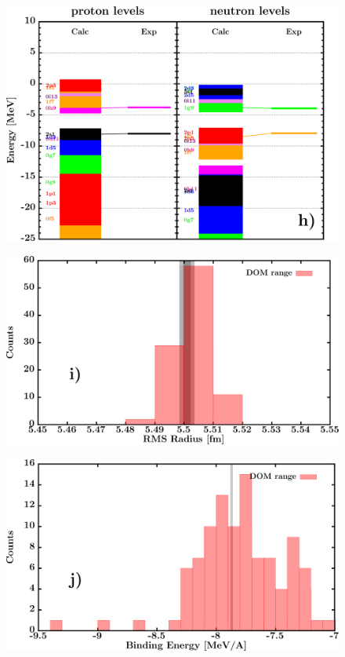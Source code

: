 \documentclass[twocolumn,secnumarabic,amssymb, nobibnotes, aps, prl,
superscriptaddress, nobalancelastpage, draft]{revtex4}
\begin{document}
\begin{figure}[!htb]
\begin{minipage}{0.4\linewidth}
        \label{DOM_pb208_chargeDensity}
    \end{minipage}\hspace{6pt}
    \begin{minipage}{0.4\linewidth}
        \centering
        \includegraphics[width=\linewidth]{figures/pb208_SPLevels.png}
        \label{DOM_pb208_SPLevels}
    \end{minipage}
    \begin{minipage}{0.4\linewidth}
        \centering
        \includegraphics[width=\linewidth]{figures/pb208_RMSRadius.png}
        \label{DOM_pb208_RMSRadius}
    \end{minipage}\hspace{6pt}
    \begin{minipage}{0.4\linewidth}
        \centering
        \includegraphics[width=\linewidth]{figures/pb208_BE.png}

\end{minipage}
\end{figure}
\end{document}
